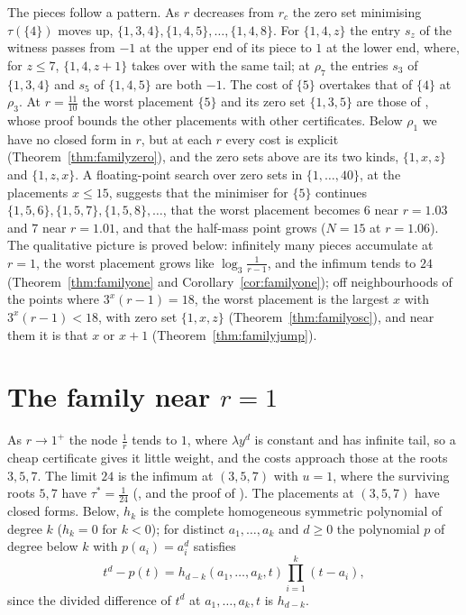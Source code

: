 \documentclass[11pt]{article}
\begin{document}
The pieces follow a pattern.  As $r$ decreases from $r_c$ the zero set
minimising $\tau(\{4\})$ moves up, $\{1,3,4\},\{1,4,5\},\ldots,\{1,4,8\}$.
For $\{1,4,z\}$ the entry $s_z$ of the witness passes from $-1$ at the
upper end of its piece to $1$ at the lower end, where, for $z\le7$,
$\{1,4,z+1\}$ takes over with the same tail; at $\rho_7$ the entries $s_3$ of $\{1,3,4\}$ and
$s_5$ of $\{1,4,5\}$ are both $-1$.  The cost of $\{5\}$ overtakes that
of $\{4\}$ at $\rho_3$.
At $r=\tfrac{11}{10}$ the worst placement $\{5\}$ and its zero set
$\{1,3,5\}$ are those of \cite[Theorem~5.4]{coefficient-mass-attainment}, whose proof bounds
the other placements with other certificates.  Below $\rho_1$ we have no
closed form in $r$, but at each $r$ every cost is explicit
(Theorem~\ref{thm:familyzero}), and the zero sets above are its two
kinds, $\{1,x,z\}$ and $\{1,z,x\}$.  A floating-point search over zero sets in $\{1,\ldots,40\}$, at the
placements $x\le15$, suggests that the minimiser for $\{5\}$ continues
$\{1,5,6\},\{1,5,7\},\{1,5,8\},\ldots$, that the worst placement becomes $6$
near $r=1.03$ and $7$ near $r=1.01$, and that the half-mass point grows
($N=15$ at $r=1.06$).  The qualitative picture is proved below: infinitely
many pieces accumulate at $r=1$, the worst placement grows like
$\log_3\frac1{r-1}$, and the infimum tends to $24$
(Theorem~\ref{thm:familyone} and Corollary~\ref{cor:familyone}); off
neighbourhoods of the points where $3^x(r-1)=18$, the worst placement is
the largest $x$ with $3^x(r-1)<18$, with zero set $\{1,x,z\}$
(Theorem~\ref{thm:familyosc}), and near them it is that $x$ or $x+1$
(Theorem~\ref{thm:familyjump}).

\section{The family near \texorpdfstring{$r=1$}{r=1}}\label{sec:nearone}

As $r\to1^+$ the node $\tfrac1r$ tends
to $1$, where $\lambda y^d$ is constant and has infinite tail, so a cheap
certificate gives it little weight, and the costs approach those at the
roots $3,5,7$.  The limit $24$ is the
infimum at $(3,5,7)$ with $u=1$, where the surviving roots $5,7$ have
$\tau^*=\tfrac1{24}$ (\cite[Theorem~4.3]{coefficient-mass-attainment}, and the proof of
\cite[Proposition~5.5]{coefficient-mass-attainment}).  The placements at $(3,5,7)$ have
closed forms.  Below, $h_k$ is the complete homogeneous symmetric
polynomial of degree $k$ ($h_k=0$ for $k<0$); for distinct
$a_1,\ldots,a_k$ and $d\ge0$ the polynomial $p$ of degree below $k$ with
$p(a_i)=a_i^d$ satisfies
\begin{equation}\label{eq:interr}
  t^d-p(t)=h_{d-k}(a_1,\ldots,a_k,t)\prod_{i=1}^k(t-a_i),
\end{equation}
since the divided difference of $t^d$ at $a_1,\ldots,a_k,t$ is $h_{d-k}$.
\end{document}
